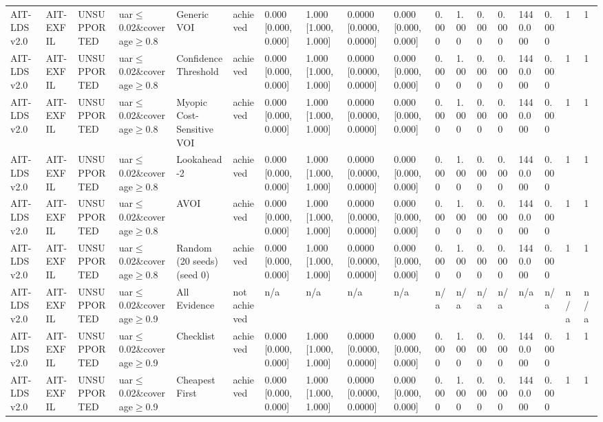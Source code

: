 \begin{table}[!ht]
{\begin{tabular}{llllllllllllllllll}
AIT-LDS v2.0 & AIT-EXFIL & UNSUPPORTED & uar$\le$0.02\&coverage$\ge$0.8 & Generic VOI & achieved & 0.000 [0.000, 0.000] & 1.000 [1.000, 1.000] & 0.0000 [0.0000, 0.0000] & 0.000 [0.000, 0.000] & 0.000 & 1.000 & 0.000 & 0.000 & 1440.000 & 0.000 & 1 & 1 \\
AIT-LDS v2.0 & AIT-EXFIL & UNSUPPORTED & uar$\le$0.02\&coverage$\ge$0.8 & Confidence Threshold & achieved & 0.000 [0.000, 0.000] & 1.000 [1.000, 1.000] & 0.0000 [0.0000, 0.0000] & 0.000 [0.000, 0.000] & 0.000 & 1.000 & 0.000 & 0.000 & 1440.000 & 0.000 & 1 & 1 \\
AIT-LDS v2.0 & AIT-EXFIL & UNSUPPORTED & uar$\le$0.02\&coverage$\ge$0.8 & Myopic Cost-Sensitive VOI & achieved & 0.000 [0.000, 0.000] & 1.000 [1.000, 1.000] & 0.0000 [0.0000, 0.0000] & 0.000 [0.000, 0.000] & 0.000 & 1.000 & 0.000 & 0.000 & 1440.000 & 0.000 & 1 & 1 \\
AIT-LDS v2.0 & AIT-EXFIL & UNSUPPORTED & uar$\le$0.02\&coverage$\ge$0.8 & Lookahead-2 & achieved & 0.000 [0.000, 0.000] & 1.000 [1.000, 1.000] & 0.0000 [0.0000, 0.0000] & 0.000 [0.000, 0.000] & 0.000 & 1.000 & 0.000 & 0.000 & 1440.000 & 0.000 & 1 & 1 \\
AIT-LDS v2.0 & AIT-EXFIL & UNSUPPORTED & uar$\le$0.02\&coverage$\ge$0.8 & AVOI & achieved & 0.000 [0.000, 0.000] & 1.000 [1.000, 1.000] & 0.0000 [0.0000, 0.0000] & 0.000 [0.000, 0.000] & 0.000 & 1.000 & 0.000 & 0.000 & 1440.000 & 0.000 & 1 & 1 \\
AIT-LDS v2.0 & AIT-EXFIL & UNSUPPORTED & uar$\le$0.02\&coverage$\ge$0.8 & Random (20 seeds) (seed 0) & achieved & 0.000 [0.000, 0.000] & 1.000 [1.000, 1.000] & 0.0000 [0.0000, 0.0000] & 0.000 [0.000, 0.000] & 0.000 & 1.000 & 0.000 & 0.000 & 1440.000 & 0.000 & 1 & 1 \\
AIT-LDS v2.0 & AIT-EXFIL & UNSUPPORTED & uar$\le$0.02\&coverage$\ge$0.9 & All Evidence & not achieved & n/a & n/a & n/a & n/a & n/a & n/a & n/a & n/a & n/a & n/a & n/a & n/a \\
AIT-LDS v2.0 & AIT-EXFIL & UNSUPPORTED & uar$\le$0.02\&coverage$\ge$0.9 & Checklist & achieved & 0.000 [0.000, 0.000] & 1.000 [1.000, 1.000] & 0.0000 [0.0000, 0.0000] & 0.000 [0.000, 0.000] & 0.000 & 1.000 & 0.000 & 0.000 & 1440.000 & 0.000 & 1 & 1 \\
AIT-LDS v2.0 & AIT-EXFIL & UNSUPPORTED & uar$\le$0.02\&coverage$\ge$0.9 & Cheapest First & achieved & 0.000 [0.000, 0.000] & 1.000 [1.000, 1.000] & 0.0000 [0.0000, 0.0000] & 0.000 [0.000, 0.000] & 0.000 & 1.000 & 0.000 & 0.000 & 1440.000 & 0.000 & 1 & 1 \\

\end{tabular}}
\end{table}
